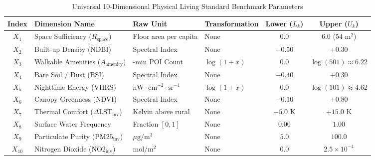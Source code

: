 \documentclass[11pt,a4paper]{article}
\begin{document}
\begin{table}[htbp]
\centering
\small
\setlength{\tabcolsep}{4.5pt}
\renewcommand{\arraystretch}{1.15}
\caption{Universal 10-Dimensional Physical Living Standard Benchmark Parameters}
\label{tab:benchmarks}
\begin{tabularx}{\textwidth}{
  c
  >{\raggedright\arraybackslash}X
  >{\raggedright\arraybackslash}p{2.8cm}
  >{\raggedright\arraybackslash}p{2.3cm}
  c
  c
}
\toprule
\textbf{Index} & \textbf{Dimension Name} & \textbf{Raw Unit} & \textbf{Transformation} & \textbf{Lower ($L_k$)} & \textbf{Upper ($U_k$)} \\
\midrule
$X_1$    & Space Sufficiency ($R_{\text{space}}$)        & Floor area per capita                        & None            & $0.0$               & $6.0$ ($54\text{ m}^2$) \\
$X_2$    & Built-up Density (NDBI)                       & Spectral Index                               & None            & $-0.50$             & $+0.30$                 \\
$X_3$    & Walkable Amenities ($A_{\text{amenity}}$)     & 15-min POI Count                             & $\log(1 + x)$   & $0.0$               & $\log(501) \approx 6.22$ \\
$X_4$    & Bare Soil / Dust (BSI)                        & Spectral Index                               & None            & $-0.40$             & $+0.30$                 \\
$X_5$    & Nighttime Energy (VIIRS)                      & $\text{nW}\cdot\text{cm}^{-2}\cdot\text{sr}^{-1}$ & $\log(1 + x)$   & $0.0$               & $\log(101) \approx 4.62$ \\
$X_6$    & Canopy Greenness (NDVI)                       & Spectral Index                               & None            & $-0.10$             & $+0.80$                 \\
$X_7$    & Thermal Comfort ($\Delta\text{LST}_{\text{inv}}$) & Kelvin above rural                       & None            & $-5.0\text{ K}$     & $+15.0\text{ K}$        \\
$X_8$    & Surface Water Frequency                       & Fraction $[0, 1]$                            & None            & $0.00$              & $1.00$                  \\
$X_9$    & Particulate Purity ($\text{PM25}_{\text{inv}}$) & $\mu\text{g}/\text{m}^3$                   & None            & $5.0$               & $100.0$                 \\
$X_{10}$ & Nitrogen Dioxide ($\text{NO2}_{\text{inv}}$)  & $\text{mol}/\text{m}^2$                      & None            & $0.0$               & $2.5 \times 10^{-4}$    \\
\bottomrule
\end{tabularx}
\end{table}
\end{document}

